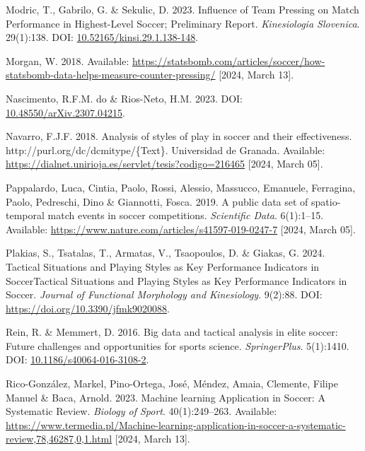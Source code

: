 \documentclass[
  a4paper,
  twoside]{uoe-thesis-template}
\newlength{\cslhangindent}
\newenvironment{CSLReferences}[2] %
 {\begin{list}{}{%
  \setlength{\itemindent}{0pt}
  \setlength{\leftmargin}{0pt}
  \setlength{\parsep}{0pt}
  \ifodd #1
   \setlength{\leftmargin}{\cslhangindent}
   \setlength{\itemindent}{-1\cslhangindent}
  \fi
  \setlength{\itemsep}{#2\baselineskip}}}
 {\end{list}}
\begin{document}
\begin{CSLReferences}{0}{0}
Modric, T., Gabrilo, G. \& Sekulic, D. 2023. Influence of {Team}
{Pressing} on {Match} {Performance} in {Highest}-{Level} {Soccer};
{Preliminary} {Report}. \emph{Kinesiologia Slovenica}. 29(1):138. DOI:
\href{https://doi.org/10.52165/kinsi.29.1.138-148}{10.52165/kinsi.29.1.138-148}.

Morgan, W. 2018. Available:
\url{https://statsbomb.com/articles/soccer/how-statsbomb-data-helps-measure-counter-pressing/}
{[}2024, March 13{]}.

Nascimento, R.F.M. do \& Rios-Neto, H.M. 2023. DOI:
\href{https://doi.org/10.48550/arXiv.2307.04215}{10.48550/arXiv.2307.04215}.

Navarro, F.J.F. 2018. Analysis of styles of play in soccer and their
effectiveness. http://purl.org/dc/dcmitype/\{Text\}. Universidad de
Granada. Available:
\url{https://dialnet.unirioja.es/servlet/tesis?codigo=216465} {[}2024,
March 05{]}.

Pappalardo, Luca, Cintia, Paolo, Rossi, Alessio, Massucco, Emanuele,
Ferragina, Paolo, Pedreschi, Dino \& Giannotti, Fosca. 2019. A public
data set of spatio-temporal match events in soccer competitions.
\emph{Scientific Data}. 6(1):1--15. Available:
\url{https://www.nature.com/articles/s41597-019-0247-7} {[}2024, March
05{]}.

Plakias, S., Tsatalas, T., Armatas, V., Tsaopoulos, D. \& Giakas, G.
2024. Tactical {Situations} and {Playing} {Styles} as {Key}
{Performance} {Indicators} in {SoccerTactical} {Situations} and
{Playing} {Styles} as {Key} {Performance} {Indicators} in {Soccer}.
\emph{Journal of Functional Morphology and Kinesiology}. 9(2):88. DOI:
\url{https://doi.org/10.3390/jfmk9020088}.

Rein, R. \& Memmert, D. 2016. Big data and tactical analysis in elite
soccer: Future challenges and opportunities for sports science.
\emph{SpringerPlus}. 5(1):1410. DOI:
\href{https://doi.org/10.1186/s40064-016-3108-2}{10.1186/s40064-016-3108-2}.

Rico-González, Markel, Pino-Ortega, José, Méndez, Amaia, Clemente,
Filipe Manuel \& Baca, Arnold. 2023. Machine learning {Application} in
{Soccer}: {A} {Systematic} {Review}. \emph{Biology of Sport}.
40(1):249--263. Available:
\url{https://www.termedia.pl/Machine-learning-application-in-soccer-a-systematic-review,78,46287,0,1.html}
{[}2024, March 13{]}.


\end{CSLReferences}
\end{document}
